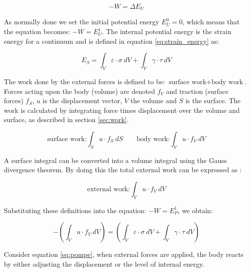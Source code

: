 \begin{equation*}
- W = \Delta E_U
\end{equation*}

As normally done we set the initial potential energy $E_U^0 = 0$,
which means that the equation becomes: $- W = E_U^1$. The internal
potential energy is the strain energy for a continuum and is defined
in equation \eqref{eq:strain_energy} as:

\begin{equation*}
  E_S = \int_{V} \varepsilon \cdot \sigma \ dV +
  \int_{V} \gamma \cdot \tau \ dV
\end{equation*}

The work done by the external forces is defined to be:
$\mbox{surface work} + \mbox{body work}$.
Forces acting upon the body (volume) are denoted $f_V$ and traction
(surface forces) $f_S$, $u$ is the displacement vector, $V$ the volume
and $S$ is the surface. The work is calculated by integrating force times
displacement over the volume and surface, as described in section
\vref{sec:work}.

\begin{equation}
  \mbox{surface work:} \int_{S} u \cdot f_S \ dS
  \qquad
  \mbox{body work:} \int_{V} u \cdot f_V \ dV 
\end{equation}

A surface integral can be converted into a volume integral
using the Gauss divergence theorem. By doing this the total external
work can be expressed as
:

\begin{equation}
  \label{eq:external-work}
  \mbox{external work:}
  \int_{V} u \cdot f_V \ dV
\end{equation}

Substituting these definitions into the equation: $ -W= E_P^1$, we obtain:

\begin{equation}
  \label{eq:pompe}
  - ( \int_{V} u \cdot f_V \ dV ) =
  ( \int_{V} \varepsilon \cdot \sigma \ dV +
  \int_{V} \gamma \cdot \tau \ dV )
\end{equation}

Consider equation \eqref{eq:pompe}, when external forces are applied,
the body reacts by either adjusting the displacement or the level of
internal energy.

